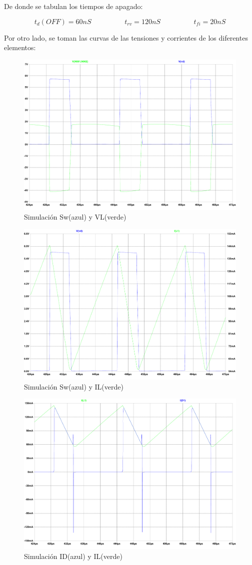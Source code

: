 \documentclass[e4_tp1_main.tex]{subfiles}
\begin{document}
De donde se tabulan los tiempos de apagado:

\[
t_d(OFF) = 60nS \hspace{2cm} t_{rv} = 120nS \hspace{2cm} t_{fi} = 20nS 
\]

Por otro lado, se toman las curvas de las tensiones y corrientes de los diferentes elementos:

\begin{figure}[H]
\centering
\includegraphics[width=0.7\linewidth]{Imagenes/Punto3/Sw-VL.pdf}
\caption{Simulación Sw(azul) y VL(verde)}
\end{figure}

\begin{figure}[H]
\centering
\includegraphics[width=0.7\linewidth]{Imagenes/Punto3/Sw-IL.pdf}
\caption{Simulación Sw(azul) y IL(verde)}
\end{figure}

\begin{figure}[H]
\centering
\includegraphics[width=0.7\linewidth]{Imagenes/Punto3/ID-IL.pdf}
\caption{Simulación ID(azul) y IL(verde)}
\end{figure}
\end{document}
